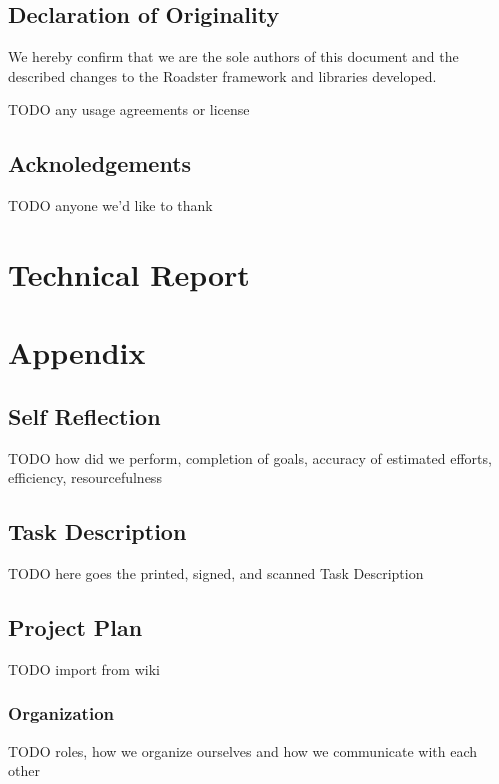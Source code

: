 \documentclass[a4paper]{report}
\begin{document}
\chapter*{Declaration of Originality}
We hereby confirm that we are the sole authors of this document and the
described changes to the Roadster framework and libraries developed.

TODO any usage agreements or license
%

\chapter*{Acknoledgements}
TODO anyone we'd like to thank




\tableofcontents
\listoffigures
\listoftables
\lstlistoflistings

\pagebreak
{}
\setcounter{page}{1}
\part{Technical Report}







\printbibliography

\appendix
\part{Appendix}
\chapter{Self Reflection}
TODO how did we perform, completion of goals, accuracy of estimated efforts, efficiency, resourcefulness

\chapter{Task Description}
TODO here goes the printed, signed, and scanned Task Description

\chapter{Project Plan}
TODO import from wiki

\section{Organization}
TODO roles, how we organize ourselves and how we communicate with each other



\end{document}

